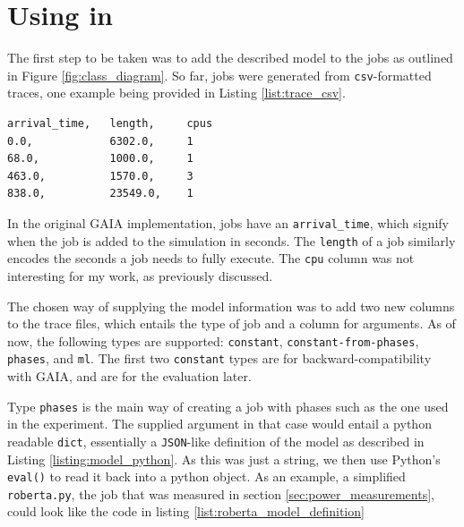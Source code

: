 \section{Using \modelname in \programname}

The first step to be taken was to add the described model to the jobs as outlined in Figure \ref{fig:class_diagram}. 
So far, jobs were generated from \verb|csv|-formatted traces, one example being provided in Listing \ref{list:trace_csv}.

\begin{minipage}{\linewidth}
\begin{lstlisting}[frame=single, numbers=none, caption={Excerpt from the Alibaba-PAI trace}, label={list:trace_csv}, basicstyle=\ttfamily]
arrival_time,   length,     cpus
0.0,            6302.0,     1
68.0,           1000.0,     1
463.0,          1570.0,     3
838.0,          23549.0,    1
\end{lstlisting}
\end{minipage}

In the original GAIA implementation, jobs have an \verb|arrival_time|, which signify when the job is added to the simulation in seconds. 
The \verb|length| of a job similarly encodes the seconds a job needs to fully execute. The \verb|cpu| column was not interesting for my work, as previously discussed.

The chosen way of supplying the model information was to add two new columns to the trace files, which entails the type of job and a column for arguments. 
As of now, the following types are supported: \verb|constant|, \verb|constant-from-phases|, \verb|phases|, and \verb|ml|. 
The first two \verb|constant| types are for backward-compatibility with GAIA, and are for the evaluation later.

Type \verb|phases| is the main way of creating a job with phases such as the one used in the experiment. The supplied argument in that case would entail a python readable \verb|dict|, essentially a \verb|JSON|-like definition of the model as described in Listing \ref{listing:model_python}.
As this was just a string, we then use Python's \verb|eval()| to read it back into a python object.
As an example, a simplified \verb|roberta.py|, the job that was measured in section \ref{sec:power_measurements}, could look like the code in listing \ref{list:roberta_model_definition}

